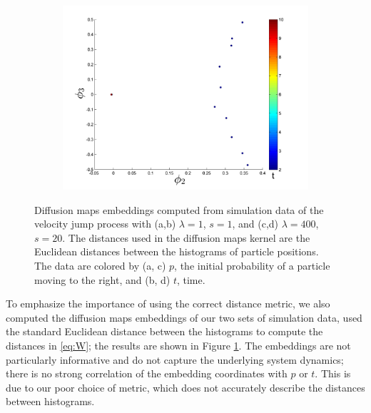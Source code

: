 \documentclass[prl, reprint, final, showkeys]{revtex4-1}
\begin{document}
\begin{figure}[t]
\begin{subfigure}{\figwidth}
\caption{}
\end{subfigure}
\begin{subfigure}{\figwidth}
\includegraphics[width=\textwidth]{rawhist_t_400}
\caption{}
\end{subfigure}
\caption{Diffusion maps embeddings computed from simulation data of the velocity jump process with (a,b) $\lambda=1$, $s=1$, and (c,d) $\lambda=400$, $s=20$. The distances used in the diffusion maps kernel are the Euclidean distances between the histograms of particle positions. The data are colored by (a, c) $p$, the initial probability of a particle moving to the right, and (b, d) $t$, time.}
\label{fig:dmaps_embed_noemd}
\end{figure}

To emphasize the importance of using the correct distance metric, we also computed the diffusion maps embeddings of our two sets of simulation data, used the standard Euclidean distance between the histograms to compute the distances in \eqref{eq:W}; the results are shown in Figure \ref{fig:dmaps_embed_noemd}.
%
The embeddings are not particularly informative and do not capture the underlying system dynamics; there is no strong correlation of the embedding coordinates with $p$ or $t$. 
%
This is due to our poor choice of metric, which does not accurately describe the distances between histograms.
\end{document}
